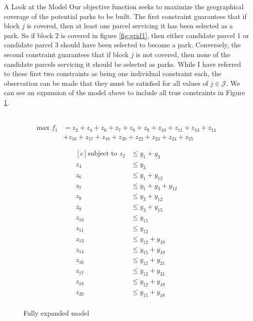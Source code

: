 \documentclass[12pt]{pom_thesis}
\begin{document}
\begin{chapter}{A Look at the Model}
	Our objective function seeks to maximize the geographical coverage of the potential parks to be built. The first constraint guarantees that if block $j$ is covered, then at least one parcel servicing it has been selected as a park. So if block 2 is covered in figure \ref{fig:grid1}, then either candidate parcel 1 or candidate parcel 3 should have been selected to become a park. Conversely, the second constraint guarantees that if block $j$ is not covered, then none of the candidate parcels servicing it should be selected as parks. While I have referred to these first two constraints as being one individual constraint each, the observation can be made that they must be satisfied for all values of $j \in \mathcal{J}$. 
\newline\newline We can see an expansion of the model above to include all true constraints in Figure \ref{expandedmodel}. \\ \\
	\begin{figure}
	\caption{Fully expanded model}
	\label{expandedmodel}
	\begin{center}
		\begin{align*}
		\textrm{max } f_1 &= z_2 + z_4 + z_6 + z_7 + z_8 + z_9 + z_{10} + z_{11} + z_{13} + z_{14} \\
		&+ z_{16} + z_{17} + z_{18} + z_{20} + z_{22} + z_{23} + z_{24} + z_{25}
		\end{align*}
	\end{center}
	\begin{equation*}
	\begin{aligned}[c]
	\textrm{subject to } z_2 &\leq y_1 + y_3 \\
	z_4 &\leq y_3\\
	z_6 &\leq y_1 + y_{12}\\
	z_7 &\leq y_1 + y_3 +y_{12}\\
	z_8 &\leq y_3 + y_{12} \\
	z_9 &\leq  y_3 + y_{15} \\
	z_{10} &\leq y_{15} \\
	z_{11} &\leq y_{12} \\
	z_{13} &\leq y_{12} + y_{19} \\
	z_{14} &\leq y_{15} + y_{19} \\
	z_{16} &\leq y_{12} + y_{21} \\
	z_{17} &\leq y_{12} + y_{21} \\
	z_{18} &\leq y_{12} + y_{19} \\
	z_{20} &\leq y_{15} + y_{19} \\

\end{aligned}
\end{equation*}
\end{figure}
\end{chapter}
\end{document}
